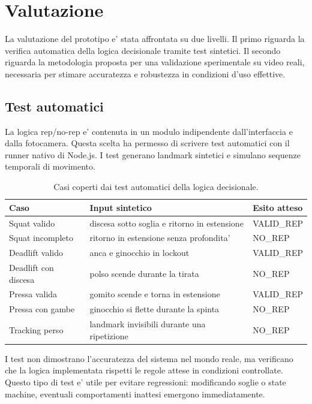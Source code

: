 
\chapter{Valutazione}
\label{ch:evaluation}

La valutazione del prototipo e' stata affrontata su due livelli. Il primo riguarda la verifica automatica della logica decisionale tramite test sintetici. Il secondo riguarda la metodologia proposta per una validazione sperimentale su video reali, necessaria per stimare accuratezza e robustezza in condizioni d'uso effettive.

\section{Test automatici}

La logica rep/no-rep e' contenuta in un modulo indipendente dall'interfaccia e dalla fotocamera. Questa scelta ha permesso di scrivere test automatici con il runner nativo di Node.js. I test generano landmark sintetici e simulano sequenze temporali di movimento.

\begin{table}[htbp]
\myfloatalign
\begin{tabular}{lll}
\toprule
Caso & Input sintetico & Esito atteso \\
\midrule
Squat valido & discesa sotto soglia e ritorno in estensione & VALID\_REP \\
Squat incompleto & ritorno in estensione senza profondita' & NO\_REP \\
Deadlift valido & anca e ginocchio in lockout & VALID\_REP \\
Deadlift con discesa & polso scende durante la tirata & NO\_REP \\
Pressa valida & gomito scende e torna in estensione & VALID\_REP \\
Pressa con gambe & ginocchio si flette durante la spinta & NO\_REP \\
Tracking perso & landmark invisibili durante una ripetizione & NO\_REP \\
\bottomrule
\end{tabular}
\caption{Casi coperti dai test automatici della logica decisionale.}
\label{tab:tests}
\end{table}

I test non dimostrano l'accuratezza del sistema nel mondo reale, ma verificano che la logica implementata rispetti le regole attese in condizioni controllate. Questo tipo di test e' utile per evitare regressioni: modificando soglie o state machine, eventuali comportamenti inattesi emergono immediatamente.

